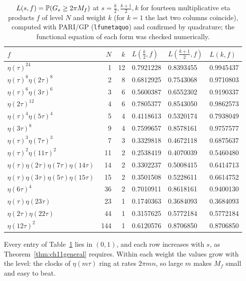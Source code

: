 \begin{table}[t]
\centering
\small
\begin{tabular}{@{}lrrlll@{}}
\toprule
$f$ & $N$ & $k$ & $L(\frac k2,f)$ & $L(\frac{k+1}2,f)$ & $L(k,f)$\\
\midrule
$\eta(\tau)^{24}$ & 1 & 12 & 0.7921228 & 0.8393455 & 0.9945437\\
$\eta(\tau)^8\eta(2\tau)^8$ & 2 & 8 & 0.6812925 & 0.7543068 & 0.9710803\\
$\eta(\tau)^6\eta(3\tau)^6$ & 3 & 6 & 0.5600387 & 0.6552302 & 0.9190337\\
$\eta(2\tau)^{12}$ & 4 & 6 & 0.7805377 & 0.8543050 & 0.9862573\\
$\eta(\tau)^4\eta(5\tau)^4$ & 5 & 4 & 0.4118613 & 0.5320174 & 0.7938049\\
$\eta(3\tau)^8$ & 9 & 4 & 0.7599657 & 0.8578161 & 0.9757577\\
$\eta(\tau)^3\eta(7\tau)^3$ & 7 & 3 & 0.3329818 & 0.4672118 & 0.6875637\\
$\eta(\tau)^2\eta(11\tau)^2$ & 11 & 2 & 0.2538419 & 0.4070039 & 0.5460480\\
$\eta(\tau)\eta(2\tau)\eta(7\tau)\eta(14\tau)$ & 14 & 2 & 0.3302237 & 0.5008415 & 0.6414713\\
$\eta(\tau)\eta(3\tau)\eta(5\tau)\eta(15\tau)$ & 15 & 2 & 0.3501508 & 0.5228611 & 0.6614752\\
$\eta(6\tau)^4$ & 36 & 2 & 0.7010911 & 0.8618161 & 0.9400130\\
$\eta(\tau)\eta(23\tau)$ & 23 & 1 & 0.1740363 & 0.3684093 & 0.3684093\\
$\eta(2\tau)\eta(22\tau)$ & 44 & 1 & 0.3157625 & 0.5772184 & 0.5772184\\
$\eta(12\tau)^2$ & 144 & 1 & 0.6120576 & 0.8706850 & 0.8706850\\
\bottomrule
\end{tabular}
\caption{$L(s,f)=\mathbb{P}(G_s\ge2\pi M_f)$ at $s=\frac k2,\frac{k+1}2,k$ for fourteen multiplicative eta products $f$ of level $N$ and weight $k$ (for $k=1$ the last two columns coincide), computed with PARI/GP (\texttt{lfunetaquo}) and confirmed by quadrature; the functional equation of each form was checked numerically.}
\label{tab:ch11values}
\end{table}

Every entry of Table~\ref{tab:ch11values} lies in $(0,1)$, and each row increases with $s$, as Theorem~\ref{thm:ch11general} requires. Within each weight the values grow with the level: the clocks of $\eta(m\tau)$ ring at rates $2\pi mn$, so large $m$ makes $M_f$ small and easy to beat.

